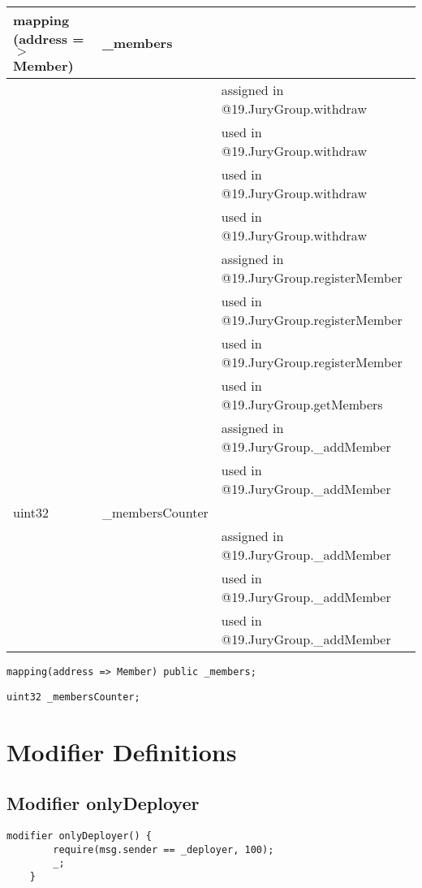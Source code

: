 \ifsoltables
\noindent\begin{tabular}{|l|l|p{5cm}|}\hline
mapping (address =$>$ Member) & \_{}members &  \\\hline
 & & assigned in @19.JuryGroup.withdraw\\\hline
 & & used in @19.JuryGroup.withdraw\\\hline
 & & used in @19.JuryGroup.withdraw\\\hline
 & & used in @19.JuryGroup.withdraw\\\hline
 & & assigned in @19.JuryGroup.registerMember\\\hline
 & & used in @19.JuryGroup.registerMember\\\hline
 & & used in @19.JuryGroup.registerMember\\\hline
 & & used in @19.JuryGroup.getMembers\\\hline
 & & assigned in @19.JuryGroup.\_{}addMember\\\hline
 & & used in @19.JuryGroup.\_{}addMember\\\hline
uint32 & \_{}membersCounter &  \\\hline
 & & assigned in @19.JuryGroup.\_{}addMember\\\hline
 & & used in @19.JuryGroup.\_{}addMember\\\hline
 & & used in @19.JuryGroup.\_{}addMember\\\hline
\end{tabular}
\fi


\begin{lstlisting}[firstnumber=14]
    mapping(address => Member) public _members;
\end{lstlisting}

\begin{lstlisting}[firstnumber=15]
    uint32 _membersCounter;
\end{lstlisting}

\section{Modifier Definitions}


\subsection{Modifier onlyDeployer}


\begin{lstlisting}[firstnumber=6]
    modifier onlyDeployer() {
        require(msg.sender == _deployer, 100);
        _;
    }
\end{lstlisting}

